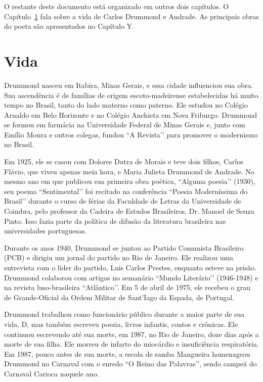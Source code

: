 \documentclass[12pt, openright,	oneside, a4paper, english, french, spanish, brazil]{abntex2}
\begin{document}
O restante deste documento está organizado em outros dois capítulos. O Capítulo~\ref{capitulo-vida} fala sobre a vida de Carlos Drummond e Andrade. As principais obras do poeta são apresentados no Capítulo Y.


\chapter{Vida}
\label{capitulo-vida}

Drummond nasceu em Itabira, Minas Gerais, e essa cidade influenciou sua obra. Sua ascendência é de famílias de origem escoto-madeirense estabelecidas há muito tempo no Brasil, tanto do lado materno como paterno. Ele estudou no Colégio Arnaldo em Belo Horizonte e no Colégio Anchieta em Nova Friburgo. Drummond se formou em farmácia na Universidade Federal de Minas Gerais e, junto com Emílio Moura e outros colegas, fundou ``A Revista’’ para promover o modernismo no Brasil.

Em 1925, ele se casou com Dolores Dutra de Morais e teve dois filhos, Carlos Flávio, que viveu apenas meia hora, e Maria Julieta Drummond de Andrade. No mesmo ano em que publicou sua primeira obra poética, ``Alguma poesia’’ (1930), seu poema ``Sentimental’’ foi recitado na conferência ``Poesia Moderníssima do Brasil’’ durante o curso de férias da Faculdade de Letras da Universidade de Coimbra, pelo professor da Cadeira de Estudos Brasileiros, Dr. Manoel de Souza Pinto. Isso fazia parte da política de difusão da literatura brasileira nas universidades portuguesas.

Durante os anos 1940, Drummond se juntou ao Partido Comunista Brasileiro (PCB) e dirigiu um jornal do partido no Rio de Janeiro. Ele realizou uma entrevista com o líder do partido, Luis Carlos Prestes, enquanto esteve na prisão. Drummond colaborou com artigos no semanário ``Mundo Literário’’ (1946-1948) e na revista luso-brasileira ``Atlântico’’. Em 5 de abril de 1975, ele recebeu o grau de Grande-Oficial da Ordem Militar de Sant'Iago da Espada, de Portugal.

Drummond trabalhou como funcionário público durante a maior parte de sua vida, D, mas também escreveu poesia, livros infantis, contos e crônicas. Ele continuou escrevendo até sua morte, em 1987, no Rio de Janeiro, doze dias após a morte de sua filha. Ele morreu de infarto do miocárdio e insuficiência respiratória. Em 1987, pouco antes de sua morte, a escola de samba Mangueira homenageou Drummond no Carnaval com o enredo ``O Reino das Palavras’’, sendo campeã do Carnaval Carioca naquele ano.
\end{document}
